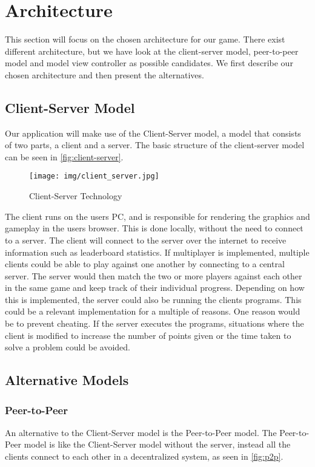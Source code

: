 \section{Architecture}

This section will focus on the chosen architecture for our game. There exist different architecture, but we have look at the client-server model, peer-to-peer model and model view controller as possible candidates. We first describe our chosen architecture and then present the alternatives.

\subsection{Client-Server Model}
Our application will make use of the Client-Server model, a model that consists of two parts, a client and a server. The basic structure of the client-server model can be seen in \autoref{fig:client-server}.

\begin{figure}[h]
  \centering
    \texttt{[image: img/client\_server.jpg]}
  \caption{Client-Server Technology \citep{ClientServer}}
  \label{fig:client-server}
\end{figure}

The client runs on the users PC, and is responsible for rendering the graphics and gameplay in the users browser.
This is done locally, without the need to connect to a server. The client will connect to the server over the internet to receive information such as leaderboard statistics. If multiplayer is implemented, multiple clients could be able to play against one another by connecting to a central server. The server would then match the two or more players against each other in the same game and keep track of their individual progress. Depending on how this is implemented, the server could also be running the clients programs. This could be a relevant implementation for a multiple of reasons. One reason would be to prevent cheating. If the server executes the programs, situations where the client is modified to increase the number of points given or the time taken to solve a problem could be avoided.

\subsection{Alternative Models}

\subsubsection{Peer-to-Peer}
An alternative to the Client-Server model is the Peer-to-Peer model. The Peer-to-Peer model is like the Client-Server model without the server, instead all the clients connect to each other in a decentralized system, as seen in \autoref{fig:p2p}.

